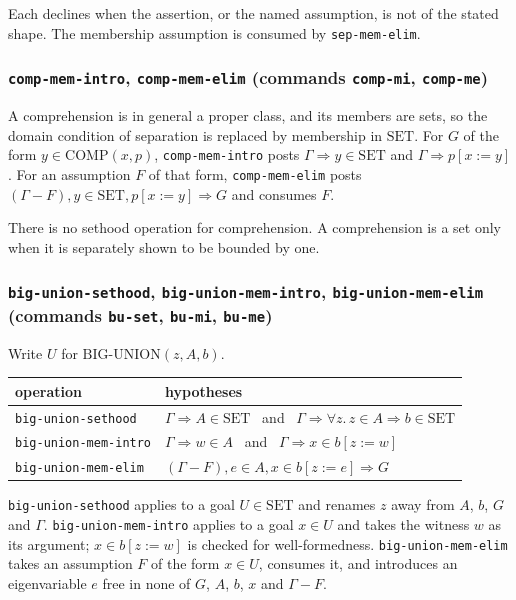 Each declines when the assertion, or the named assumption, is not of the
stated shape.  The membership assumption is consumed by
\texttt{sep-mem-elim}.

\subsubsection*{\texttt{comp-mem-intro}, \texttt{comp-mem-elim}
  (commands \texttt{comp-mi}, \texttt{comp-me})}

A comprehension is in general a proper class, and its members are sets,
so the domain condition of separation is replaced by membership in
$\mathrm{SET}$.  For $G$ of the form $y \in \mathrm{COMP}(x,p)$,
\texttt{comp-mem-intro} posts $\Gamma \Longrightarrow y \in \mathrm{SET}$
and $\Gamma \Longrightarrow p[x{:=}y]$.  For an assumption $F$ of that
form, \texttt{comp-mem-elim} posts
$(\Gamma - F), y \in \mathrm{SET}, p[x{:=}y] \Longrightarrow G$ and
consumes $F$.

There is no sethood operation for comprehension.  A comprehension is a
set only when it is separately shown to be bounded by one.

\subsubsection*{\texttt{big-union-sethood}, \texttt{big-union-mem-intro},
  \texttt{big-union-mem-elim}
  (commands \texttt{bu-set}, \texttt{bu-mi}, \texttt{bu-me})}

Write $U$ for $\mathrm{BIG\text{-}UNION}(z, A, b)$.

\begin{center}
\begin{tabular}{@{}ll@{}}
\toprule
operation & hypotheses \\
\midrule
\texttt{big-union-sethood} & $\Gamma \Longrightarrow A \in \mathrm{SET}$ \ and \ $\Gamma \Longrightarrow \forall z.\, z \in A \Rightarrow b \in \mathrm{SET}$ \\
\texttt{big-union-mem-intro} & $\Gamma \Longrightarrow w \in A$ \ and \ $\Gamma \Longrightarrow x \in b[z{:=}w]$ \\
\texttt{big-union-mem-elim} & $(\Gamma - F), e \in A, x \in b[z{:=}e] \Longrightarrow G$ \\
\bottomrule
\end{tabular}
\end{center}

\texttt{big-union-sethood} applies to a goal $U \in \mathrm{SET}$ and
renames $z$ away from $A$, $b$, $G$ and $\Gamma$.
\texttt{big-union-mem-intro} applies to a goal $x \in U$ and takes the
witness $w$ as its argument; $x \in b[z{:=}w]$ is checked for
well-formedness.  \texttt{big-union-mem-elim} takes an assumption $F$ of
the form $x \in U$, consumes it, and introduces an eigenvariable $e$ free
in none of $G$, $A$, $b$, $x$ and $\Gamma - F$.

